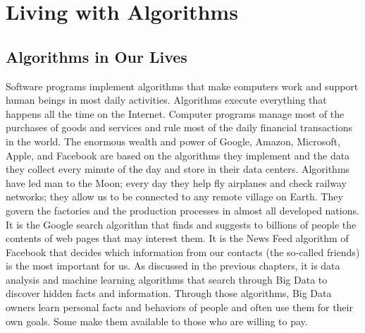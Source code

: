 



%

\setcounter{chapter}{4}

\chapter{\label{chap:5}Living with Algorithms}



\section{\label{sec:5.1}Algorithms in Our Lives}

Software programs implement algorithms that make computers work and support human beings in most daily activities. Algorithms execute everything that happens all the time on the Internet. Computer programs manage most of the purchases of goods and services and rule most of the daily financial transactions in the world. The enormous wealth and power of Google, Amazon, Microsoft, Apple, and Facebook are based on the algorithms they implement and the data they collect every minute of the day and store in their data centers. Algorithms have led man to the Moon; every day they help fly airplanes and check railway networks; they allow us to be connected to any remote village on Earth. They govern the factories and the production processes in almost all developed nations. It is the Google search algorithm that finds and suggests to billions of people the contents of web pages that may interest them. It is the News Feed algorithm of Facebook that decides which information from our contacts (the so-called friends) is the most important for us. As discussed in the previous chapters, it is data analysis and machine learning algorithms that search through Big Data to discover hidden facts and information. Through those algorithms, Big Data owners learn personal facts and behaviors of people and often use them for their own goals. Some make them available to those who are willing to pay.

